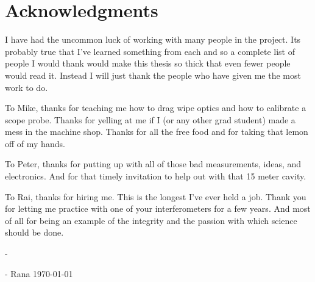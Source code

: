 
\cleardoublepage
\pagestyle{empty}
\setcounter{savepage}{\thepage}
\begin{abstractpage}

\end{abstractpage}

% 

\cleardoublepage

\section*{Acknowledgments}

I have had the uncommon luck of working with many people in the project.
Its probably true that I've learned something from each and so a complete
list of people I would thank would make this thesis so thick that even
fewer people would read it. Instead I will just thank the people who
have given me the most work to do.

To Mike, thanks for teaching me how to drag wipe optics and how 
to calibrate a scope probe. Thanks for yelling at me if I (or any other grad
student) made a mess in the machine shop. Thanks for all the free food
and for taking that lemon off of my hands.

To Peter, thanks for putting up with all of those bad measurements,
ideas, and electronics. And for that timely invitation to
help out with that 15 meter cavity.

To Rai, thanks for hiring me. This is the longest I've ever held a job.
Thank you for letting me practice with one of your interferometers for a
few years. And most of all for being an example of the integrity and the
passion with which science should be done.

-

- Rana \today
